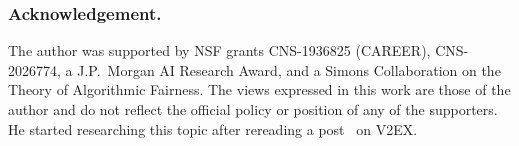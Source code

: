\subsubsection{Acknowledgement.}
The author was supported by NSF grants CNS-1936825 (CAREER), CNS-2026774, a J.P.~Morgan AI Research Award, and a Simons Collaboration on the Theory of Algorithmic Fairness.
The views expressed in this work are those of the author and do not reflect the official policy or position of any of the supporters.
He started researching this topic after rereading a post~\cite{V2EX:759538} on V2EX.
